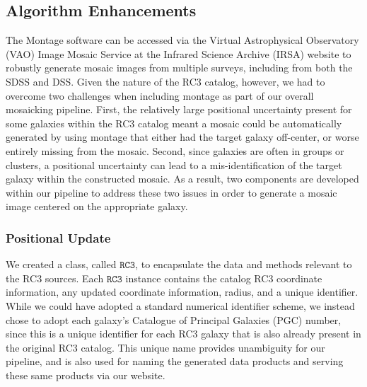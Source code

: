 \documentclass[authoryear, 12pt, 5p, times]{elsarticle}
\begin{document}
\subsection{Algorithm Enhancements}

The Montage software can be accessed via the Virtual Astrophysical Observatory (VAO) Image Mosaic Service at the Infrared Science Archive (IRSA) website to robustly generate mosaic images from multiple surveys, including from both the SDSS and DSS. Given the nature of the RC3 catalog, however, we had to overcome two challenges when including montage as part of our overall mosaicking pipeline. First, the relatively large positional uncertainty present for some galaxies within the RC3 catalog meant a mosaic could be automatically generated by using montage that either had the target galaxy off-center, or worse entirely missing from the mosaic. Second, since galaxies are often in groups or clusters, a positional uncertainty can lead to a mis-identification of the target galaxy within the constructed mosaic. As a result, two components are developed within our pipeline to address these two issues in order to generate a mosaic image centered on the appropriate galaxy.

\subsubsection{Positional Update\label{pos-sec}} 

We created a class, called $\texttt{RC3}$, to encapsulate the data and methods relevant to the RC3 sources. Each $\texttt{RC3}$ instance contains the catalog RC3 coordinate information, any updated coordinate information, radius, and a unique identifier. While we could have adopted a standard numerical identifier scheme, we instead chose to adopt each galaxy's Catalogue of Principal Galaxies (PGC) number, since this is a unique identifier for each RC3 galaxy that is also already present in the original RC3 catalog. This unique name provides unambiguity for our pipeline, and is also used for naming the generated data products and serving these same products via our website.
\end{document}
